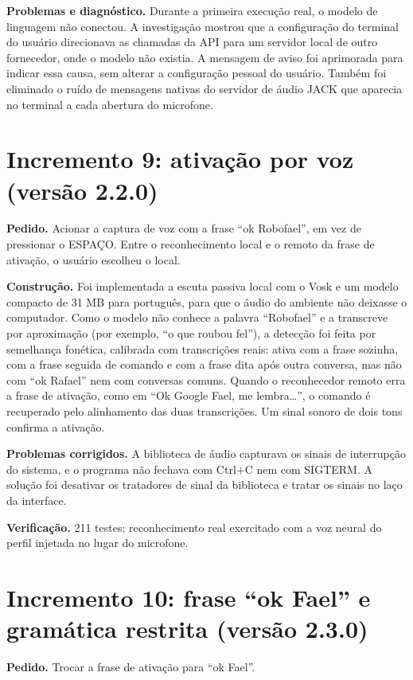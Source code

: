 \textbf{Problemas e diagnóstico.} Durante a primeira execução real, o modelo de linguagem não
conectou. A investigação mostrou que a configuração do terminal do usuário direcionava as chamadas da API
para um servidor local de outro fornecedor, onde o modelo não existia. A mensagem de aviso foi
aprimorada para indicar essa causa, sem alterar a configuração pessoal do usuário. Também foi eliminado
o ruído de mensagens nativas do servidor de áudio JACK que aparecia no terminal a cada abertura do
microfone.

\section{Incremento 9: ativação por voz (versão 2.2.0)}

\textbf{Pedido.} Acionar a captura de voz com a frase “ok Robofael”, em vez de pressionar o ESPAÇO.
Entre o reconhecimento local e o remoto da frase de ativação, o usuário escolheu o local.

\textbf{Construção.} Foi implementada a escuta passiva local com o Vosk e um modelo compacto de
31 MB para português, para que o áudio do ambiente não deixasse o computador. Como o modelo não conhece
a palavra “Robofael” e a transcreve por aproximação (por exemplo, “o que roubou fel”), a detecção foi
feita por semelhança fonética, calibrada com transcrições reais: ativa com a frase sozinha, com a frase
seguida de comando e com a frase dita após outra conversa, mas não com “ok Rafael” nem com conversas
comuns. Quando o reconhecedor remoto erra a frase de ativação, como em “Ok Google Fael, me lembra…”, o
comando é recuperado pelo alinhamento das duas transcrições. Um sinal sonoro de dois tons confirma a
ativação.

\textbf{Problemas corrigidos.} A biblioteca de áudio capturava os sinais de interrupção do sistema, e
o programa não fechava com Ctrl+C nem com SIGTERM. A solução foi desativar os tratadores de sinal da
biblioteca e tratar os sinais no laço da interface.

\textbf{Verificação.} 211 testes; reconhecimento real exercitado com a voz neural do perfil injetada no
lugar do microfone.

\section{Incremento 10: frase “ok Fael” e gramática restrita (versão 2.3.0)}

\textbf{Pedido.} Trocar a frase de ativação para “ok Fael”.

